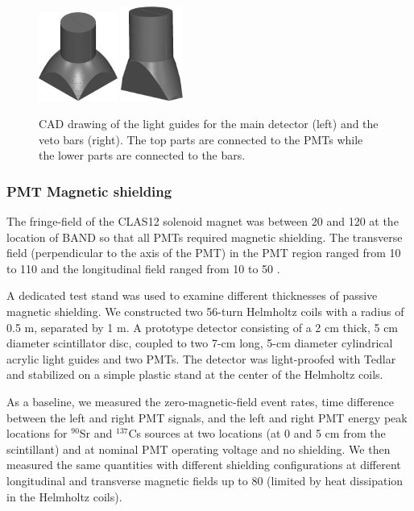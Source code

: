 \documentclass[3p,final,twocolumn]{elsarticle}
\begin{document}
\begin{figure}[tb]
	\centering
	\includegraphics[width=0.23\textwidth]{bar_lg.png}
		\includegraphics[width=0.18\textwidth]{veto_lg.png}
	\caption{CAD drawing of the light guides for the main detector (left) and the veto bars (right). The top parts are connected to the PMTs while the lower parts are connected to the bars.}
	\label{fig:lightguides}
\end{figure}

\subsubsection{PMT Magnetic shielding}
The fringe-field of the CLAS12 solenoid magnet
\cite{Fair:2020yfx} was between 20 and 120 \si{\gauss} at the location of
BAND so that all PMTs required magnetic shielding. The transverse
field (perpendicular to the axis of the PMT) in the PMT region ranged from 10 to
  110 \si{\gauss} and the longitudinal field ranged from 10 to 50 \si{\gauss}.

  A dedicated test stand was used to examine different thicknesses of
  passive magnetic shielding.  We constructed two 56-turn Helmholtz
  coils with a radius of 0.5 \si{\meter}, separated by 1 \si{\meter}. A
  prototype detector consisting of a 2 \si{\centi\meter} thick, 5
  \si{\centi\meter} diameter scintillator disc, coupled to two
  7-\si{\centi\meter} long, 5-\si{\centi\meter} diameter cylindrical
  acrylic light guides and two PMTs. The detector was
  light-proofed with Tedlar and stabilized on a simple plastic stand
  at the center of the Helmholtz coils.

  As a baseline, we measured the zero-magnetic-field 
event rates, time difference between the left and right PMT signals,
and the left and right PMT energy peak locations for $^{90}$Sr and
  $^{137}$Cs sources at two locations (at 0 and 5 \si{\centi\meter} from the scintillant) and  at nominal
  PMT operating voltage and no shielding.  We then measured the same quantities with different
  shielding configurations at different longitudinal and transverse
  magnetic fields up to 80 \si{\gauss} (limited by heat dissipation in the
  Helmholtz coils).
\end{document}
